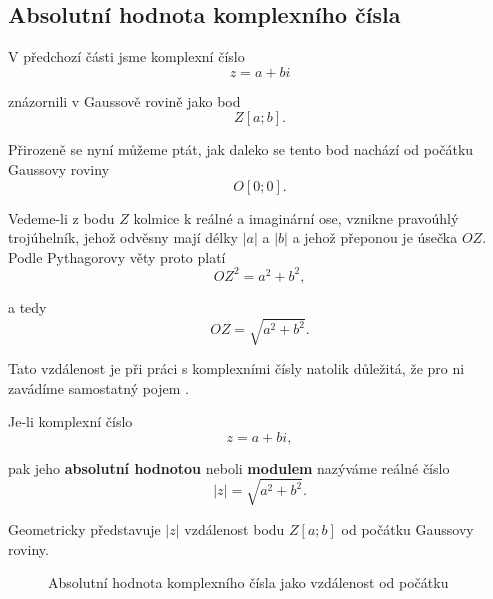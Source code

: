 \documentclass[12pt,a4paper]{article}
\begin{document}

\subsection{Absolutní hodnota komplexního čísla}
V předchozí části jsme komplexní číslo
\[
    z=a+bi
\]

znázornili v Gaussově rovině jako bod
\[
    Z[a;b].
\]

Přirozeně se nyní můžeme ptát, jak daleko se tento bod nachází od počátku Gaussovy roviny
\[
    O[0;0].
\]

Vedeme-li z bodu $Z$ kolmice k reálné a imaginární ose, vznikne pravoúhlý
trojúhelník, jehož odvěsny mají délky $|a|$ a $|b|$ a jehož přeponou je úsečka
$OZ$. Podle Pythagorovy věty proto platí
\[
    OZ^2=a^2+b^2,
\]

a tedy
\[
    OZ=\sqrt{a^2+b^2}.
\]

Tato vzdálenost je při práci s komplexními čísly natolik důležitá, že pro ni
zavádíme samostatný pojem .

\begin{definitionbox}
    Je-li komplexní číslo
    \[
        z=a+bi,
    \]

    pak jeho \textbf{absolutní hodnotou} neboli \textbf{modulem} nazýváme reálné číslo
    \[
        |z|=\sqrt{a^2+b^2}.
    \]

    Geometricky představuje $|z|$ vzdálenost bodu $Z[a;b]$ od počátku Gaussovy roviny.
\end{definitionbox}



\begin{figure}[ht]
    \begin{center}
        \caption{Absolutní hodnota komplexního čísla jako vzdálenost od počátku}
    \end{center}
\end{figure}
\end{document}
